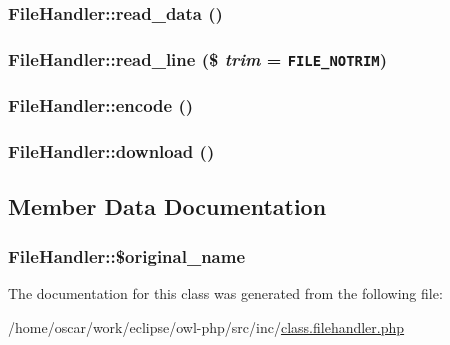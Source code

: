 \hypertarget{classFileHandler_1389a6ea19a22471c301d70b5ed68ed8}{
\subsubsection{\setlength{\rightskip}{0pt plus 5cm}FileHandler::read\_\-data ()}}
\label{classFileHandler_1389a6ea19a22471c301d70b5ed68ed8}


\hypertarget{classFileHandler_69f84a8138f717c84f560125f1f95448}{
\subsubsection{\setlength{\rightskip}{0pt plus 5cm}FileHandler::read\_\-line (\$ {\em trim} = {\tt {\bf FILE\_\-NOTRIM}})}}
\label{classFileHandler_69f84a8138f717c84f560125f1f95448}


\hypertarget{classFileHandler_a29360bf94fd54d906256561f33d93ad}{
\subsubsection{\setlength{\rightskip}{0pt plus 5cm}FileHandler::encode ()}}
\label{classFileHandler_a29360bf94fd54d906256561f33d93ad}


\hypertarget{classFileHandler_c17edc9b92643c32ae6040b1235c64dd}{
\subsubsection{\setlength{\rightskip}{0pt plus 5cm}FileHandler::download ()}}
\label{classFileHandler_c17edc9b92643c32ae6040b1235c64dd}




\subsection{Member Data Documentation}
\hypertarget{classFileHandler_477708585850c3c8725ccf56bfe0b4a8}{
\subsubsection{\setlength{\rightskip}{0pt plus 5cm}FileHandler::\$original\_\-name}}
\label{classFileHandler_477708585850c3c8725ccf56bfe0b4a8}




The documentation for this class was generated from the following file:\begin{CompactItemize}
\item 
/home/oscar/work/eclipse/owl-php/src/inc/\hyperlink{class_8filehandler_8php}{class.filehandler.php}\end{CompactItemize}
